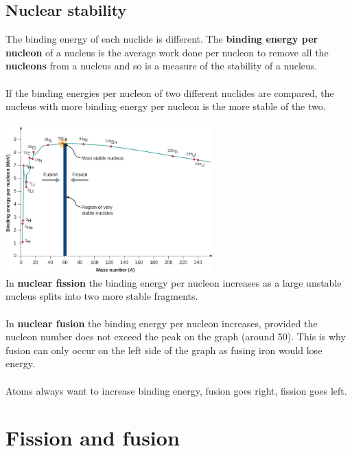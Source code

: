 \documentclass{article}[18pt]
\begin{document}
\subsection{Nuclear stability}
The binding energy of each nuclide is different. The \textbf{binding energy per nucleon} of a nucleus is the average work done per nucleon to remove all the \textbf{nucleons} from a nucleus and so is a measure of the stability of a nucleus.\\
\\
If the binding energies per nucleon of two different nuclides are compared, the nucleus with more binding energy per nucleon is the more stable of the two.\\
\\
\includegraphics[width=8cm]{Binding_Energy.jpg}\\
In \textbf{nuclear fission} the binding energy per nucleon increases as a large unstable nucleus splits into two more stable fragments.\\
\\
In \textbf{nuclear fusion} the binding energy per nucleon increases, provided the nucleon number does not exceed the peak on the graph (around 50). This is why fusion can only occur on the left side of the graph as fusing iron would lose energy.\\
\\
Atoms always want to increase binding energy, fusion goes right, fission goes left.
\newpage
\section{Fission and fusion}
\end{document}

